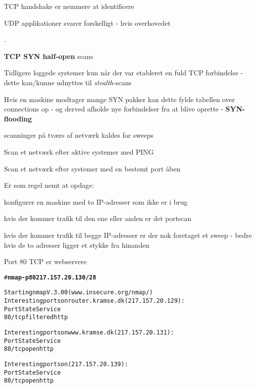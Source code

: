 \documentclass[Screen16to9,17pt]{foils}
\begin{document}
{\hlkbig TCP handshake er nemmere at identificere

UDP applikationer svarer forskelligt - hvis overhovedet}

.

\begin{list2}
\item {\bfseries TCP SYN half-open} scans
\item Tidligere loggede systemer kun når der var etableret en fuld TCP
  forbindelse - dette kan/kunne udnyttes til \emph{stealth}-scans
\item Hvis en maskine modtager mange SYN pakker kan dette fylde
  tabellen over connections op - og derved afholde nye forbindelser
  fra at blive oprette - {\bfseries SYN-flooding}
\end{list2}



\begin{list1}
\item scanninger på tværs af netværk kaldes for sweeps
\item Scan et netværk efter aktive systemer med PING
\item Scan et netværk efter systemer med en bestemt port åben
\item Er som regel nemt at opdage:
  \begin{list2}
    \item konfigurer en maskine med to IP-adresser som ikke er i brug
\item hvis der kommer trafik til den ene eller anden er det portscan
\item hvis der kommer trafik til begge IP-adresser er der nok
  foretaget et sweep - bedre hvis de to adresser ligger et stykke fra hinanden
  \end{list2}

\end{list1}


\begin{list1}
  \item Port 80 TCP er webservere
\end{list1}

\begin{alltt}
\small # {\bfseries nmap  -p 80 217.157.20.130/28}

Starting nmap V. 3.00 ( www.insecure.org/nmap/ )
Interesting ports on router.kramse.dk (217.157.20.129):
Port       State       Service
80/tcp     filtered    http

Interesting ports on www.kramse.dk (217.157.20.131):
Port       State       Service
80/tcp     open        http

Interesting ports on  (217.157.20.139):
Port       State       Service
80/tcp     open        http

\end{alltt}
\end{document}
